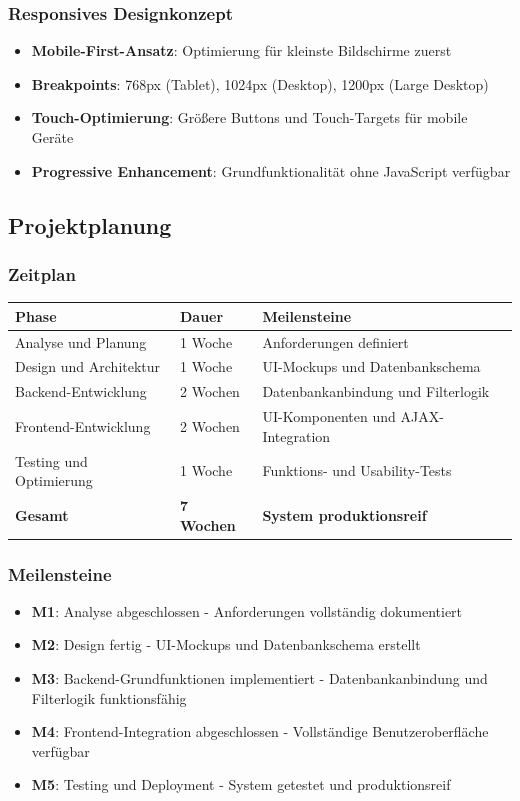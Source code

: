 \documentclass[11pt,a4paper]{article}
\begin{document}
\subsubsection{Responsives Designkonzept}
\begin{itemize}
    \item \textbf{Mobile-First-Ansatz}: Optimierung für kleinste Bildschirme zuerst
    \item \textbf{Breakpoints}: 768px (Tablet), 1024px (Desktop), 1200px (Large Desktop)
    \item \textbf{Touch-Optimierung}: Größere Buttons und Touch-Targets für mobile Geräte
    \item \textbf{Progressive Enhancement}: Grundfunktionalität ohne JavaScript verfügbar
\end{itemize}

\subsection{Projektplanung}

\subsubsection{Zeitplan}
\begin{center}
\begin{tabular}{|l|l|l|}
\hline
\textbf{Phase} & \textbf{Dauer} & \textbf{Meilensteine} \\
\hline
Analyse und Planung & 1 Woche & Anforderungen definiert \\
\hline
Design und Architektur & 1 Woche & UI-Mockups und Datenbankschema \\
\hline
Backend-Entwicklung & 2 Wochen & Datenbankanbindung und Filterlogik \\
\hline
Frontend-Entwicklung & 2 Wochen & UI-Komponenten und AJAX-Integration \\
\hline
Testing und Optimierung & 1 Woche & Funktions- und Usability-Tests \\
\hline
\textbf{Gesamt} & \textbf{7 Wochen} & \textbf{System produktionsreif} \\
\hline
\end{tabular}
\end{center}

\subsubsection{Meilensteine}
\begin{itemize}
    \item \textbf{M1}: Analyse abgeschlossen - Anforderungen vollständig dokumentiert
    \item \textbf{M2}: Design fertig - UI-Mockups und Datenbankschema erstellt
    \item \textbf{M3}: Backend-Grundfunktionen implementiert - Datenbankanbindung und Filterlogik funktionsfähig
    \item \textbf{M4}: Frontend-Integration abgeschlossen - Vollständige Benutzeroberfläche verfügbar
    \item \textbf{M5}: Testing und Deployment - System getestet und produktionsreif
\end{itemize}
\end{document}
